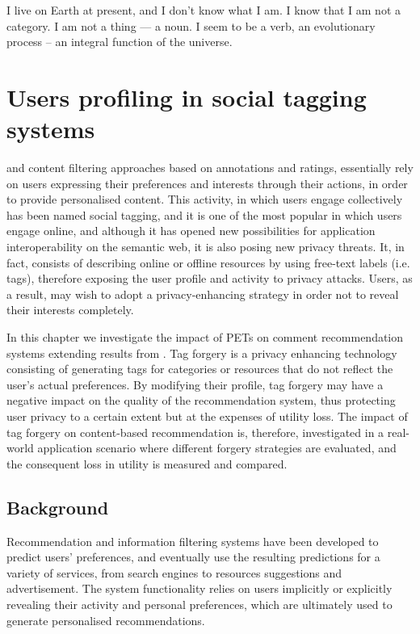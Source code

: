 \begin{savequote}[75mm] 
I live on Earth at present, and I don't know what I am. I know that I am not a category. I am not a thing — a noun. I seem to be a verb, an evolutionary process – an integral function of the universe.
\end{savequote}

\chapter{Users profiling in social tagging systems}

 and content filtering approaches based on annotations and ratings, essentially rely on users expressing their preferences and interests through their actions, in order to provide personalised content. This activity, in which users engage collectively has been named social tagging, and it is one of the most popular in which users engage online, and although it has opened new possibilities for application interoperability on the semantic web, it is also posing new privacy threats. It, in fact, consists of describing online or offline resources by using free-text labels (i.e. tags), therefore exposing the user profile and activity to privacy attacks. Users, as a result, may wish to adopt a privacy-enhancing strategy in order not to reveal their interests completely. 

In this chapter we investigate the impact of PETs on comment recommendation systems extending results from \cite{puglisi2015content}. Tag forgery is a privacy enhancing technology consisting of generating tags for categories or resources that do not reflect the user's actual preferences. By modifying their profile, tag forgery may have a negative impact on the quality of the recommendation system, thus protecting user privacy to a certain extent but at the expenses of utility loss. The impact of tag forgery on content-based recommendation is, therefore, investigated in a real-world application scenario where different forgery strategies are evaluated, and the consequent loss in utility is measured and compared.

\section{Background}
\noindent
Recommendation and information filtering systems have been developed to predict users' preferences, and eventually use the resulting predictions for a variety of services, from search engines to resources suggestions and advertisement. The system functionality relies on users implicitly or explicitly revealing their activity and personal preferences, which are ultimately used to generate personalised recommendations.

